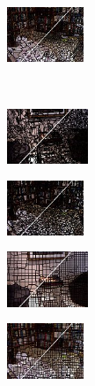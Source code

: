 \begin{figure}
\begin{subfigure}[b]{0.1375\textwidth}
    \end{subfigure}
    \begin{subfigure}[b]{0.129\textwidth}
        \includegraphics[height=1.65cm]{pictures/sunrgbd/dasp/cropped/dasp_00007477_contours}
    \end{subfigure}\\
    \begin{subfigure}[b]{0.02\textwidth}
    \end{subfigure}
    \begin{subfigure}[b]{0.1375\textwidth}
        \includegraphics[height=1.65cm]{pictures/nyuv2/seeds/cropped/seeds_00001297_contours}
    \end{subfigure}
    \begin{subfigure}[b]{0.129\textwidth}
        \includegraphics[height=1.65cm]{pictures/sunrgbd/seeds/cropped/seeds_00007477_contours}
    \end{subfigure}
    \begin{subfigure}[b]{0.02\textwidth}
    \end{subfigure}
    \begin{subfigure}[b]{0.1375\textwidth}
        \includegraphics[height=1.65cm]{pictures/nyuv2/tps/cropped/tps_00001297_contours}
    \end{subfigure}
    \begin{subfigure}[b]{0.129\textwidth}
        \includegraphics[height=1.65cm]{pictures/sunrgbd/tps/cropped/tps_00007477_contours}

\end{subfigure}
\end{figure}
